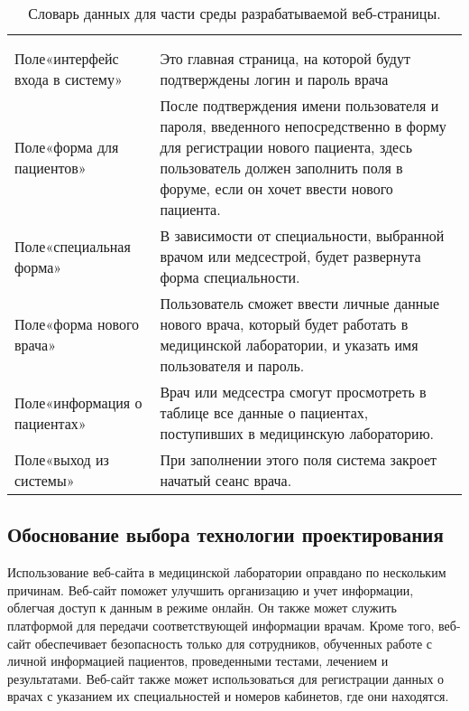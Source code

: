 \begin{xltabular}{\textwidth}{|p{4cm}|p{12cm}|}
	\caption{Словарь данных для части среды разрабатываемой веб-страницы.\label{table:dic}}\\ \hline
	 &  \\ \hline
	 &  \\ \hline
	\endfirsthead
	 &  \\ \hline
	\finishhead
	Поле«интерфейс входа в систему» & Это главная страница, на которой будут подтверждены логин и пароль врача \\ \hline 
	Поле«форма для пациентов» & После подтверждения имени пользователя и пароля, введенного непосредственно в форму для регистрации нового пациента, здесь пользователь должен заполнить поля в форуме, если он хочет ввести нового пациента. \\ \hline 
	Поле«специальная форма» & В зависимости от специальности, выбранной врачом или медсестрой, будет развернута форма специальности.  \\ \hline 
	Поле«форма нового врача» & Пользователь сможет ввести личные данные нового врача, который будет работать в медицинской лаборатории, и указать имя пользователя и пароль.  \\ \hline 
	Поле«информация о пациентах» & Врач или медсестра смогут просмотреть в таблице все данные о пациентах, поступивших в медицинскую лабораторию. \\ \hline 
	Поле«выход из системы» & При заполнении этого поля система закроет начатый сеанс врача.  \\ \hline 
\end{xltabular}

\subsection{Обоснование выбора технологии проектирования}

Использование веб-сайта в медицинской лаборатории оправдано по нескольким причинам. Веб-сайт поможет улучшить организацию и учет информации, облегчая доступ к данным в режиме онлайн. Он также может служить платформой для передачи соответствующей информации врачам. Кроме того, веб-сайт обеспечивает безопасность только для сотрудников, обученных работе с личной информацией пациентов, проведенными тестами, лечением и результатами. Веб-сайт также может использоваться для регистрации данных о врачах с указанием их специальностей и номеров кабинетов, где они находятся.

